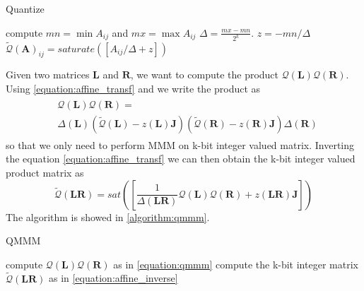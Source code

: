 \begin{algorithm}
	\caption{Quantize}\label{algorithm:quantize}
	\begin{algorithmic}[1]
		\State compute $mn = \min A_{ij}$ and $mx = \max A_{ij}$
		\State $\Delta = \frac{mx - mn}{2^k}$.
		\State $z = -mn/\Delta$
			\State $\tilde{\mathcal{Q}}(\mathbf{A})_{ij} = saturate([A_{ij}/\Delta + z ])$ 
		\EndFor
	\end{algorithmic}
\end{algorithm}

 Given two matrices $\mathbf{L}$ and $\mathbf{R}$, we want to compute the product $\mathcal{Q}(\mathbf{L}) \mathcal{Q}(\mathbf{R})$. Using \cref{equation:affine_transf} and we write the product as 
\begin{align}\label{equation:qmmm}
\begin{split}
& \mathcal{Q}(\mathbf{L}) \mathcal{Q}(\mathbf{R}) =\\
 & \Delta (\mathbf{L})\left( \tilde{\mathcal{Q}}(\mathbf{L}) - z(\mathbf{L})\mathbf{J} \right)
\left( \tilde{\mathcal{Q}}(\mathbf{R}) - z(\mathbf{R})\mathbf{J} \right)  \Delta (\mathbf{R})
\end{split}
\end{align}
so that we only need to perform MMM on k-bit integer valued matrix. Inverting the equation \ref{equation:affine_transf}  we can then obtain the k-bit integer valued product matrix as 
\begin{equation}\label{equation:affine_inverse}
\tilde{\mathcal{Q}}(\mathbf{LR}) = sat([\frac{1}{\Delta(\mathbf{LR})}\mathcal{Q}(\mathbf{L}) \mathcal{Q}(\mathbf{R}) + z(\mathbf{LR}) \mathbf{J}])
\end{equation} The algorithm is showed in \cref{algorithm:qmmm}.

\begin{algorithm}
	\caption{QMMM}\label{algorithm:qmmm}
	\begin{algorithmic}[1]
		\State compute $\mathcal{Q}(\mathbf{L}) \mathcal{Q}(\mathbf{R})$ as in \cref{equation:qmmm}
		\State compute the k-bit integer matrix $\tilde{\mathcal{Q}}(\mathbf{LR})$ as in \cref{equation:affine_inverse}
 	\end{algorithmic}
\end{algorithm}

